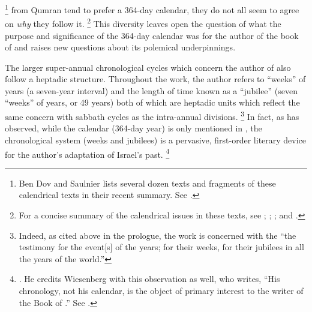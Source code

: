     \footnote{%
        Ben Dov and Saulnier lists several dozen texts and fragments of these calendrical texts in their recent summary. See 
            \cite[132--133]{bendov-saulnier_cbr2008}.}
from Qumran tend to prefer a 364-day calendar, they do not all seem to agree on \emph{why} they follow it.%
    \footnote{%
        For a concise summary of the calendrical issues in these texts, see 
            \cite{vanderkam1998};
            \cite[233--268]{glessmer_flint-vanderkam1999};
            \cite[127--135]{bendov-saulnier_cbr2008}; and 
            \cite{jacobus_brooke-hempel2018}.}
This diversity leaves open the question of what the purpose and significance of the 364-day calendar was for the author of the book of \jub and raises new questions about its polemical underpinnings.%
    \autocite{fraade_dine-israel2010}

The larger super-annual chronological cycles which concern the author of \jub also follow a heptadic structure. Throughout the work, the author refers to ``weeks'' of years (a seven-year interval) and the length of time known as a ``jubilee'' (seven ``weeks'' of years, or 49 years) both of which are heptadic units which reflect the same concern with sabbath cycles as the intra-annual divisions.%
    \footnote{%
        Indeed, as cited above in the prologue, the work is concerned with the ``the testimony for the event[s] of the years; for their weeks, for their jubilees in all the years of the world.''}
In fact, as \vanderkam has observed, while the calendar (364-day year) is only mentioned in , the chronological system (weeks and jubilees) is a pervasive, first-order literary device for the author's adaptation of Israel's past.%
    \footnote{%
        \Cite[522]{vanderkam-b_vanderkam2000}. He credits Wiesenberg with this observation as well, who writes, ``His chronology, not his calendar, is the object of primary interest to the writer of the Book of \jub.'' See 
        \cite[4]{wiesenberg_rev-qumran1961}.}


